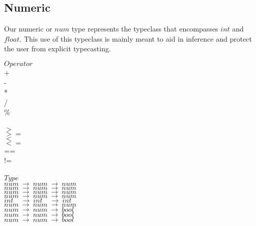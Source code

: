 \documentclass[5pt]{article}
\begin{document}
\subsection{Numeric}
Our numeric or $num$ type represents the typeclass that encompasses $int$ and $float$. This use of this typeclass is mainly meant to aid in inference and protect the user from explicit typecasting.
\begin{multicols}{3}
\noindent $Operator$ \\
\hspace*{5mm} + \\
\hspace*{5mm} - \\
\hspace*{5mm} * \\
\hspace*{5mm} / \\
\hspace*{5mm} \% \\
\hspace*{5mm} \^ \\
\hspace*{5mm} $>$ \\
\hspace*{5mm} $>=$ \\
\hspace*{5mm} $<$ \\
\hspace*{5mm} $<=$ \\
\hspace*{5mm} == \\
\hspace*{5mm} != \\
\columnbreak \\
\noindent $Type$ \\
$num \ \rightarrow \ num \ \rightarrow \ num $ \\
$num \ \rightarrow \ num \ \rightarrow \ num $ \\
$num \ \rightarrow \ num \ \rightarrow \ num $ \\
$num \ \rightarrow \ num \ \rightarrow \ num $ \\
$int \quad \rightarrow \ int \quad \rightarrow \ int $ \\
$num \ \rightarrow \ num \ \rightarrow \ num $ \\
$num \ \rightarrow \ num \ \rightarrow \ bool $ \\
$num \ \rightarrow \ num \ \rightarrow \ bool $ \\
$num \ \rightarrow \ num \ \rightarrow \ bool $ \\

\end{multicols}
\end{document}
